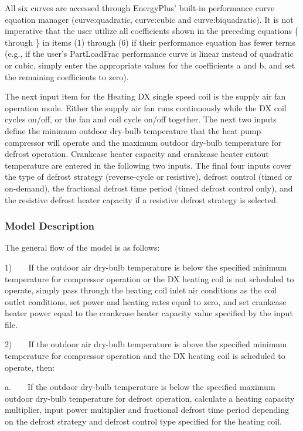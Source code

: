 All six curves are accessed through EnergyPlus' built-in performance curve equation manager (curve:quadratic, curve:cubic and curve:biquadratic). It is not imperative that the user utilize all coefficients shown in the preceding equations \{ through \} in items (1) through (6) if their performance equation has fewer terms (e.g., if the user's PartLoadFrac performance curve is linear instead of quadratic or cubic, simply enter the appropriate values for the coefficients a and b, and set the remaining coefficients to zero).

The next input item for the Heating DX single speed coil is the supply air fan operation mode. Either the supply air fan runs continuously while the DX coil cycles on/off, or the fan and coil cycle on/off together. The next two inputs define the minimum outdoor dry-bulb temperature that the heat pump compressor will operate and the maximum outdoor dry-bulb temperature for defrost operation. Crankcase heater capacity and crankcase heater cutout temperature are entered in the following two inputs. The final four inputs cover the type of defrost strategy (reverse-cycle or resistive), defrost control (timed or on-demand), the fractional defrost time period (timed defrost control only), and the resistive defrost heater capacity if a resistive defrost strategy is selected.

\subsubsection{Model Description}\label{model-description-4-001}

The general flow of the model is as follows:

1)~~~~If the outdoor air dry-bulb temperature is below the specified minimum temperature for compressor operation or the DX heating coil is not scheduled to operate, simply pass through the heating coil inlet air conditions as the coil outlet conditions, set power and heating rates equal to zero, and set crankcase heater power equal to the crankcase heater capacity value specified by the input file.

2)~~~~If the outdoor air dry-bulb temperature is above the specified minimum temperature for compressor operation and the DX heating coil is scheduled to operate, then:

a.~~~~If the outdoor dry-bulb temperature is below the specified maximum outdoor dry-bulb temperature for defrost operation, calculate a heating capacity multiplier, input power multiplier and fractional defrost time period depending on the defrost strategy and defrost control type specified for the heating coil.

